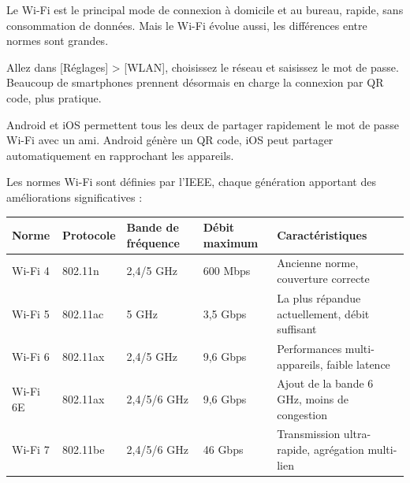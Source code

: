 
Le Wi-Fi est le principal mode de connexion à domicile et au bureau, rapide, sans consommation de données. Mais le Wi-Fi évolue aussi, les différences entre normes sont grandes.


Allez dans [Réglages] > [WLAN], choisissez le réseau et saisissez le mot de passe. Beaucoup de smartphones prennent désormais en charge la connexion par QR code, plus pratique.


Android et iOS permettent tous les deux de partager rapidement le mot de passe Wi-Fi avec un ami. Android génère un QR code, iOS peut partager automatiquement en rapprochant les appareils.


Les normes Wi-Fi sont définies par l'IEEE, chaque génération apportant des améliorations significatives :

\begin{center}
\begin{tabularx}{\linewidth}{|X|X|X|X|X|}
\hline
\textbf{Norme} & \textbf{Protocole} & \textbf{Bande de fréquence} & \textbf{Débit maximum} & \textbf{Caractéristiques} \tabularnewline
\hline
Wi-Fi 4 & 802.11n & 2,4/5 GHz & 600 Mbps & Ancienne norme, couverture correcte \tabularnewline
Wi-Fi 5 & 802.11ac & 5 GHz & 3,5 Gbps & La plus répandue actuellement, débit suffisant \tabularnewline
Wi-Fi 6 & 802.11ax & 2,4/5 GHz & 9,6 Gbps & Performances multi-appareils, faible latence \tabularnewline
Wi-Fi 6E & 802.11ax & 2,4/5/6 GHz & 9,6 Gbps & Ajout de la bande 6 GHz, moins de congestion \tabularnewline
Wi-Fi 7 & 802.11be & 2,4/5/6 GHz & 46 Gbps & Transmission ultra-rapide, agrégation multi-lien \tabularnewline
\hline
\end{tabularx}
\end{center}


